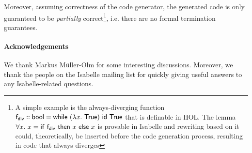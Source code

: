  Moreover, assuming correctness of the code generator, the generated code is only guaranteed to be {\em partially} correct\footnote{A simple example is the always-diverging function ${\sf f_{div}}::{\sf bool} = {\sf while}~(\lambda x.~{\sf True})~{\sf id}~{\sf True}$ that is definable in HOL. The lemma $\forall x.~ x = {\sf if}~{\sf f_{div}}~{\sf then}~x~{\sf else}~x$ is provable in Isabelle and rewriting based on it could, theoretically, be inserted before the code generation process, resulting in code that always diverges}, i.e. there are no formal termination guarantees.

\paragraph{Acknowledgements} We thank Markus M\"uller-Olm for some interesting discussions. Moreover, we thank the people on the Isabelle mailing list for quickly giving useful answers to any Isabelle-related questions.
